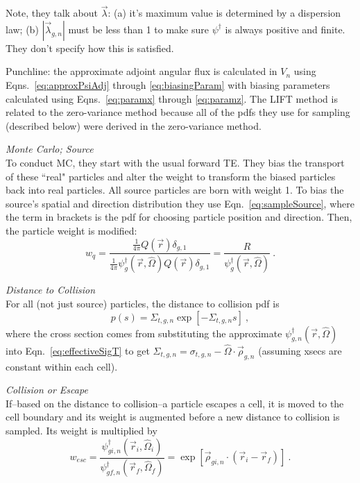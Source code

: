 \documentclass[12pt,twoside]{article}
\newcommand{\vOmega}{\ensuremath{\hat{\Omega}}}
\begin{document}
Note, they talk about $\vec{\lambda}$: (a) it's maximum value is determined by a dispersion law; (b) $|\vec{\lambda}_{g,n}|$ must be less than 1 to make sure $\psi^{\dagger}$ is always positive and finite. They don't specify how this is satisfied.

\vspace*{1em}
Punchline: the approximate adjoint angular flux is calculated in $V_n$ using Eqns.~\eqref{eq:approxPsiAdj} through \eqref{eq:biasingParam} with biasing parameters calculated using Eqns.~\eqref{eq:paramx} through \eqref{eq:paramz}. The LIFT method is related to the zero-variance method because all of the pdfs they use for sampling (described below) were derived in the zero-variance method. 


\vspace*{1em}
\noindent \textit{Monte Carlo; Source}\\
To conduct MC, they start with the usual forward TE. They bias the transport of these ``real" particles and alter the weight to transform the biased particles back into real particles. All source particles are born with weight 1. To bias the source's spatial and direction distribution they use Eqn.~\eqref{eq:sampleSource}, where the term in brackets is the pdf for choosing particle position and direction. Then, the particle weight is modified:
\begin{equation}
  w_q = \frac{\frac{1}{4 \pi} Q(\vec{r}) \delta_{g,1}}{\frac{1}{4 \pi}\psi^{\dagger}_{g}(\vec{r}, \vOmega) Q(\vec{r}) \delta_{g,1}} 
  = \frac{R}{\psi^{\dagger}_{g}(\vec{r}, \vOmega)} \:.
\end{equation} 


\vspace*{1em}
\noindent \textit{Distance to Collision}\\
For all (not just source) particles, the distance to collision pdf is
\begin{equation}
  p(s) = \Sigma_{t,g,n} \exp[-\Sigma_{t,g,n} s] \:,
\end{equation}
where the cross section comes from substituting the approximate $\psi^{\dagger}_{g,n}(\vec{r}, \vOmega)$ into Eqn.~\eqref{eq:effectiveSigT} to get $\Sigma_{t,g,n} = \sigma_{t,g,n} - \vOmega \cdot \vec{\rho}_{g,n}$ (assuming xsecs are constant within each cell).


\vspace*{1em}
\noindent \textit{Collision or Escape}\\
If--based on the distance to collision--a particle escapes a cell, it is moved to the cell boundary and its weight is augmented before a new distance to collision is sampled. Its weight is multiplied by
\begin{equation}
  w_{esc} = \frac{\psi^{\dagger}_{gi,n}(\vec{r}_i, \vOmega_i)}{\psi^{\dagger}_{gf,n}(\vec{r}_f, \vOmega_f)} = \exp[\vec{\rho}_{gi,n} \cdot (\vec{r}_i - \vec{r}_f)]\:.
\end{equation}
\end{document}
